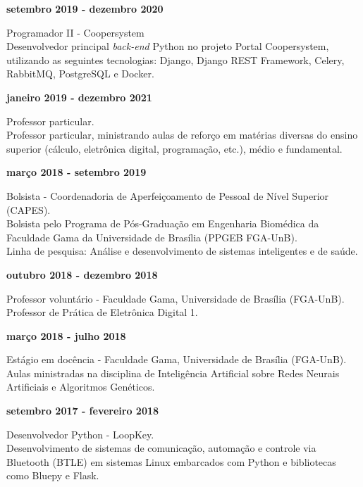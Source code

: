 \documentclass[11pt]{article}
\begin{document}
\textbf{setembro 2019 - dezembro 2020}
\begin{addmargin}{0.5cm}
Programador II - Coopersystem \\
Desenvolvedor principal \textit{back-end} Python no projeto Portal Coopersystem,
utilizando as seguintes tecnologias: Django, Django REST Framework, Celery, 
RabbitMQ, PostgreSQL e Docker.\\
\end{addmargin}

\textbf{janeiro 2019 - dezembro 2021}
\begin{addmargin}{0.5cm}
Professor particular. \\
Professor particular, ministrando aulas de reforço em matérias diversas
do ensino superior (cálculo, eletrônica digital, programação, etc.), médio
e fundamental.\\
\end{addmargin}

\textbf{março 2018 - setembro 2019}
\begin{addmargin}{0.5cm}
Bolsista - Coordenadoria de Aperfeiçoamento de Pessoal de Nível Superior (CAPES). \\
Bolsista pelo Programa de Pós-Graduação em Engenharia Biomédica
da Faculdade Gama da Universidade de Brasília (PPGEB FGA-UnB).\\
Linha de pesquisa: Análise e desenvolvimento de sistemas inteligentes e de saúde.\\
\end{addmargin}

\textbf{outubro 2018 - dezembro 2018}
\begin{addmargin}{0.5cm}
Professor voluntário - Faculdade Gama, Universidade de Brasília (FGA-UnB).\\
Professor de Prática de Eletrônica Digital 1. \\
\end{addmargin}

\textbf{março 2018 - julho 2018}
\begin{addmargin}{0.5cm}
Estágio em docência - Faculdade Gama, Universidade de Brasília (FGA-UnB).\\
Aulas ministradas na disciplina de Inteligência Artificial sobre Redes 
Neurais Artificiais e Algoritmos Genéticos. \\
\end{addmargin}

\textbf{setembro 2017 - fevereiro 2018}
\begin{addmargin}{0.5cm}
Desenvolvedor Python - LoopKey.\\
Desenvolvimento de sistemas de comunicação, automação e controle via Bluetooth
(BTLE) em sistemas Linux embarcados com Python e bibliotecas como
Bluepy e Flask. \\
\end{addmargin}
\end{document}
